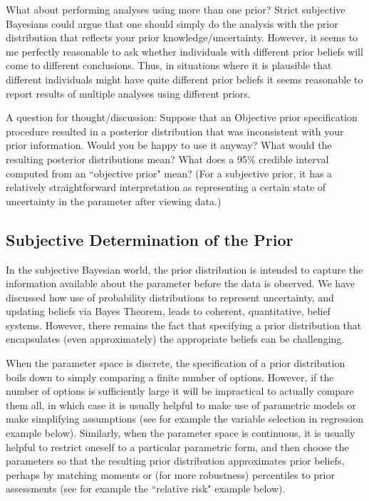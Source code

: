 \documentclass[12pt]{article}
\begin{document}
What about performing analyses using more than one prior? Strict subjective Bayesians could argue that one should simply do the analysis with
the prior distribution that reflects your prior knowledge/uncertainty.
However, it seems to me perfectly reasonable to 
ask whether individuals with different prior beliefs will come to different conclusions. Thus, in situations
where it is plausible that different individuals might have quite different prior beliefs it seems reasonable to report results of multiple analyses using different priors.

A question for thought/discussion:
Suppose that an Objective prior specification procedure resulted in a posterior distribution that was
inconsistent with your prior information. Would you be happy to use it anyway? What would the resulting posterior distributions mean?
What does a 95\% credible interval computed from an ``objective prior" mean? (For a subjective
prior, it has a relatively straightforward interpretation as representing a certain state of uncertainty in the parameter after viewing data.)



\subsection{Subjective Determination of the Prior}

In the subjective Bayesian world, the prior distribution is intended
to capture the information available about the parameter before the
data is observed.  We have discussed how use of probability distributions to represent uncertainty,
and updating beliefs via Bayes Theorem, leads to coherent, quantitative,
belief systems. However, there remains the fact that specifying a 
prior distribution that encapsulates (even approximately) the appropriate beliefs can be challenging.  

When the parameter space is discrete, the specification of a prior distribution boils down to simply comparing a finite number of options.
However, if the number of options is sufficiently
large it will be impractical to actually compare them all, in which case it is usually helpful to make use of parametric models or make simplifying assumptions (see for example the variable selection in regression example below). Similarly,
when the parameter space is continuous, it is usually helpful to restrict oneself to a particular parametric form, and then choose the parameters 
so that the resulting prior distribution approximates prior beliefs, perhaps by
  matching moments or (for more robustness) percentiles to prior assessments (see for example the ``relative risk" example below). 
\end{document}
